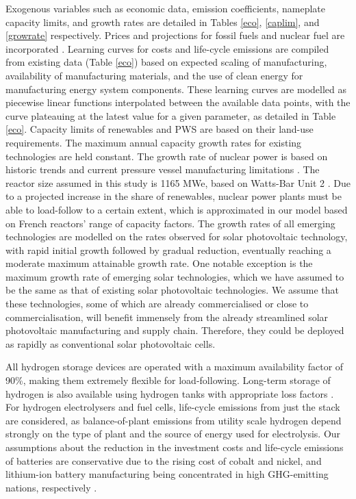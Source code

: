 Exogenous variables such as economic data, emission coefficients, nameplate capacity limits, and growth rates are detailed in Tables \ref{eco}, \ref{caplim}, and \ref{growrate} respectively. Prices and projections for fossil fuels and nuclear fuel are incorporated \cite{wittenstein_projected_2015, world_bank_commodity_2016, international_energy_agency_world_2019}. Learning curves for costs and life-cycle emissions are compiled from existing data (Table \ref{eco}) based on expected scaling of manufacturing, availability of manufacturing materials, and the use of clean energy for manufacturing energy system components. These learning curves are modelled as piecewise linear functions interpolated between the available data points, with the curve plateauing at the latest value for a given parameter, as detailed in Table \ref{eco}. Capacity limits of renewables and \gls{PWS} are based on their land-use requirements. The maximum annual capacity growth rates for existing technologies are held constant. The growth rate of nuclear power is based on historic trends and current pressure vessel manufacturing limitations \cite{iaea_pris_nodate}. The reactor size assumed in this study is 1165 MWe, based on Watts-Bar Unit 2 \cite{iaea_pris_nodate-1}. Due to a projected increase in the share of renewables, nuclear power plants must be able to load-follow to a certain extent, which is approximated in our model based on French reactors' range of capacity factors. The growth rates of all emerging technologies are modelled on the rates observed for solar photovoltaic technology, with rapid initial growth followed by gradual reduction, eventually reaching a moderate maximum attainable growth rate. One notable exception is the maximum growth rate of emerging solar technologies, which we have assumed to be the same as that of existing solar photovoltaic technologies. We assume that these technologies, some of which are already commercialised or close to commercialisation, will benefit immensely from the already streamlined solar photovoltaic manufacturing and supply chain. Therefore, they could be deployed as rapidly as conventional solar photovoltaic cells. 

All hydrogen storage devices are operated with a maximum availability factor of 90\%, making them extremely flexible for load-following. Long-term storage of hydrogen is also available using hydrogen tanks with appropriate loss factors \cite{iea_technology_2015}. For hydrogen electrolysers and fuel cells, life-cycle emissions from just the stack are considered, as balance-of-plant emissions from utility scale hydrogen depend strongly on the type of plant and the source of energy used for electrolysis. Our assumptions about the reduction in the investment costs and life-cycle emissions of batteries are conservative due to the rising cost of cobalt and nickel, and lithium-ion battery manufacturing being concentrated in high \gls{GHG}-emitting nations, respectively \cite{oliveira_environmental_2015,emilsson_lithium-ion_2019,turcheniuk_ten_2018,simon_potential_2015}. 

